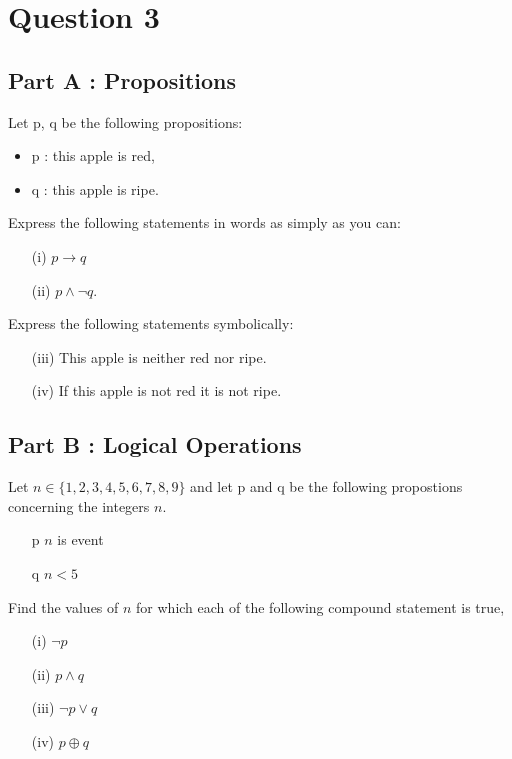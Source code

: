 \documentclass[]{report}
\begin{document}
\section*{Question 3}
\subsection*{Part A : Propositions}
Let p, q be the following propositions:
\begin{itemize}
\item p : this apple is red, 
\item q : this apple is ripe.
\end{itemize}

\noindent Express the following statements in words as simply as you can:
\begin{itemize}
\item[(i)] $p \rightarrow q$
\item[(ii)] $p \wedge \neg q$.
\end{itemize}

\noindent Express the following statements symbolically:
\begin{itemize}
\item[(iii)] This apple is neither red nor ripe.
\item[(iv)] If this apple is not red it is not ripe.
\end{itemize}

\subsection*{Part B : Logical Operations}
Let $n \in \{1,2,3,4,5,6,7,8,9\}$ and let p and q be the following propostions concerning 
the integers $n$.

\begin{itemize}
\item[p] $n$ is event
\item[q] $n<5$
\end{itemize}

Find the values of $n$ for which each of the following compound statement is true,

\begin{itemize}
\item[(i)] $\neg p$
\item[(ii)] $p \wedge q$
\item[(iii)] $\neg p \vee q$ 
\item[(iv)] $p \oplus q$
\end{itemize}
\end{document}
